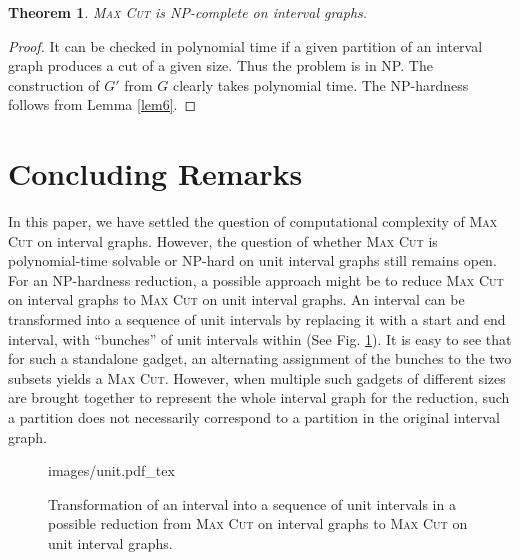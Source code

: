 \documentclass[11pt]{article}
\newtheorem{theorem}{Theorem}
\begin{document}
 
 
\begin{theorem}
 \textsc{Max Cut} is NP-complete on interval graphs.
\end{theorem}

\begin{proof}
 It can be checked in polynomial time if a given partition of an interval graph produces a cut of a given size. Thus the problem is in NP. The construction of $G'$ from $G$ clearly takes polynomial time. The NP-hardness follows from Lemma \ref{lem6}. 
\end{proof}
 

 
 
 

\section{Concluding Remarks}
 In this paper, we have settled the question of computational complexity of \textsc{Max Cut} on interval graphs. However, the question of whether \textsc{Max Cut} is polynomial-time solvable or NP-hard on unit interval graphs still remains open. For an NP-hardness reduction, a possible approach might be to reduce \textsc{Max Cut} on interval graphs to \textsc{Max Cut} on unit interval graphs. An interval can be transformed into a sequence of unit intervals by replacing it with a start and end interval, with ``bunches'' of unit intervals within (See Fig. \ref{fig: unit}). It is easy to see that for such a standalone gadget, an alternating assignment of the bunches to the two subsets yields a \textsc{Max Cut}. However, when multiple such gadgets of different sizes are brought together to represent the whole interval graph for the reduction, such a partition does not necessarily correspond to a partition in the original interval graph.
 
  
\begin{figure}[h!]
\centering

{
    \fontsize{8pt}{8pt}\selectfont%
    \def\svgwidth{1\textwidth}
    {images/unit.pdf_tex}
}


\caption[Short Caption]{Transformation of an interval into a sequence of unit intervals in a possible reduction from \textsc{Max Cut} on interval graphs to \textsc{Max Cut} on unit interval graphs.}
\label{fig: unit}
\end{figure}
\end{document}
